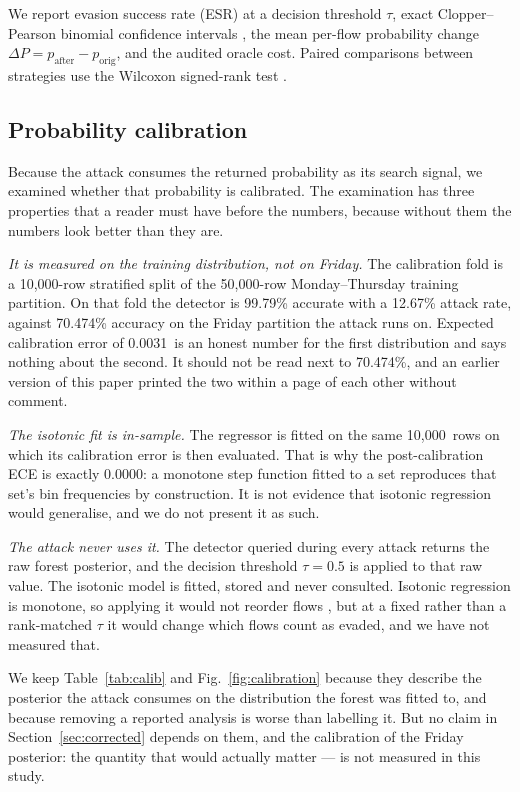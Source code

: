 \documentclass[journal]{IEEEtran}
\providecommand{\citep}[1]{\cite{#1}}
\theoremstyle{definition}
\newcommand{\testacc}{70.474}
\newcommand{\trainrows}{50{,}000}
\newcommand{\eceraw}{0.0031}
\newcommand{\eceiso}{0.0000}
\newcommand{\calrows}{10{,}000}
\newcommand{\Calacc}{99.79}
\newcommand{\Calpos}{12.67}
\begin{document}
We report evasion success rate (ESR) at a decision threshold $\tau$, exact
Clopper--Pearson binomial confidence intervals \citep{clopper1934ci}, the mean
per-flow probability change $\Delta P = p_{\text{after}} - p_{\text{orig}}$, and
the audited oracle cost. Paired comparisons between strategies use the Wilcoxon
signed-rank test \citep{wilcoxon1945}.

\subsection{Probability calibration}
\label{sec:calibration}
Because the attack consumes the returned probability as its search signal, we
examined whether that probability is calibrated. The examination has three
properties that a reader must have before the numbers, because without them the
numbers look better than they are.

\emph{It is measured on the training distribution, not on Friday.} The
calibration fold is a \calrows-row stratified split of the \trainrows-row
Monday--Thursday training partition. On that fold the detector is \Calacc\%
accurate with a \Calpos\% attack rate, against \testacc\% accuracy on the Friday
partition the attack runs on. Expected calibration error of \eceraw\ is an
honest number for the first distribution and says nothing about the second. It
should not be read next to \testacc\%, and an earlier version of this paper
printed the two within a page of each other without comment.

\emph{The isotonic fit is in-sample.} The regressor is fitted on the same
\calrows\ rows on which its calibration error is then evaluated. That is why the
post-calibration ECE is exactly \eceiso: a monotone step function fitted to a
set reproduces that set's bin frequencies by construction. It is not evidence
that isotonic regression would generalise, and we do not present it as such.

\emph{The attack never uses it.} The detector queried during every attack
returns the raw forest posterior, and the decision threshold $\tau=0.5$ is
applied to that raw value. The isotonic model is fitted, stored and never
consulted. Isotonic regression is monotone, so applying it would not reorder
flows \citep{niculescu2005predicting}, but at a fixed rather than a
rank-matched $\tau$ it would change which flows count as evaded, and we have not
measured that.

We keep Table~\ref{tab:calib} and Fig.~\ref{fig:calibration} because they
describe the posterior the attack consumes on the distribution the forest was
fitted to, and because removing a reported analysis is worse than labelling it.
But no claim in Section~\ref{sec:corrected} depends on them, and the
calibration of the Friday posterior: the quantity that would actually matter
--- is not measured in this study.
\end{document}
